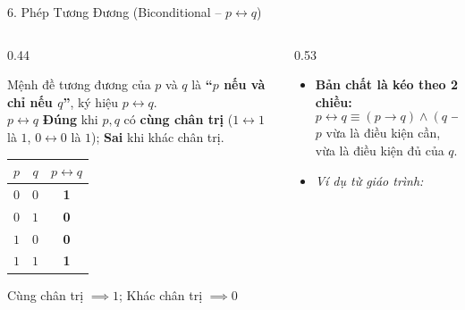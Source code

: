 \documentclass[aspectratio=169, 10pt]{beamer}
\begin{document}
\begin{frame}{6. Phép Tương Đương (Biconditional -- $p \leftrightarrow q$)}
  \begin{columns}[t, onlytextwidth]
    \begin{column}{0.44\textwidth}
      \begin{cozyDef}
        \small
        Mệnh đề tương đương của $p$ và $q$ là \textbf{``$p$ nếu và chỉ nếu $q$''}, ký hiệu $p \leftrightarrow q$.\\
        \vspace{0.05cm}
        $p \leftrightarrow q$ \textbf{\textcolor{cozyTrue}{Đúng}} khi $p, q$ có \textbf{cùng chân trị} ($1 \leftrightarrow 1$ là $1$, $0 \leftrightarrow 0$ là $1$); \textbf{\textcolor{cozyFalse}{Sai}} khi khác chân trị.
        \vspace{0.15cm}
        \begin{center}
          \renewcommand{\arraystretch}{1.1}
          \begin{tabular}{cc|c}
            \toprule
            $p$ & $q$ & $p \leftrightarrow q$ \\
            \midrule
            $0$ & $0$ & \textbf{\textcolor{cozyTrue}{1}} \\
            $0$ & $1$ & \textbf{\textcolor{cozyFalse}{0}} \\
            $1$ & $0$ & \textbf{\textcolor{cozyFalse}{0}} \\
            $1$ & $1$ & \textbf{\textcolor{cozyTrue}{1}} \\
            \bottomrule
          \end{tabular}
        \end{center}
        \vspace{0.05cm}
        \par\footnotesize\centering\color{cozyMuted}Cùng chân trị $\implies 1$; Khác chân trị $\implies 0$
      \end{cozyDef}
    \end{column}
    \begin{column}{0.53\textwidth}
      \begin{cozyInsight}
        \small
        \begin{itemize}
          \setlength{\itemsep}{3pt}
          \item \textbf{Bản chất là kéo theo 2 chiều:}
          $$p \leftrightarrow q \equiv (p \to q) \land (q \to p)$$
          $p$ vừa là điều kiện cần, vừa là điều kiện đủ của $q$.
          \item \textit{Ví dụ từ giáo trình:}\\

\end{itemize}
\end{cozyInsight}
\end{column}
\end{columns}
\end{frame}
\end{document}
